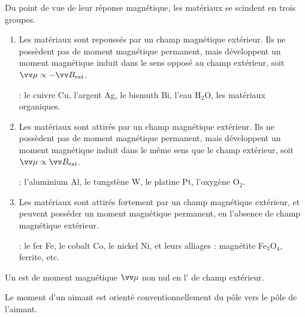 \documentclass[12pt,fancy]{cours}
\begin{document}
Du point de vue de leur réponse magnétique, les matériaux se scindent en trois groupes.
\begin{enumerate}
  \item Les matériaux  sont repoussés par un champ magnétique extérieur. Ils ne possèdent pas de moment magnétique permanent, mais développent un moment magnétique induit dans le sens opposé au champ extérieur, soit $\M \propto -\B_{\rm ext}$. 
  
  \hspace{1cm} : le cuivre Cu, l'argent Ag, le bismuth Bi, l'eau H$_2$O, les matériaux organiques.
  \item Les matériaux  sont attirés par un champ magnétique extérieur. Ils ne possèdent pas de moment magnétique permanent, mais développent un moment magnétique induit dans le même sens que le champ extérieur, soit $\M \propto \B_{\rm ext}$.
  
  \hspace{1cm} : l'aluminium Al, le tungstène W, le platine Pt, l'oxygène O$_2$.
  \item Les matériaux  sont attirés fortement par un champ magnétique extérieur, et peuvent posséder un moment magnétique permanent, en l'absence de champ magnétique extérieur.
  
  \hspace{1cm} : le fer Fe, le cobalt Co, le nickel Ni, et leurs alliages : magnétite Fe$_3$O$_4$, ferrite, etc.
\end{enumerate} 

\begin{definition}\label{def:}
Un  est de moment magnétique $\M$ non nul en l' de champ extérieur. 

Le moment d'un aimant est orienté conventionnellement du pôle  vers le pôle  de l'aimant.
\end{definition}
\end{document}
